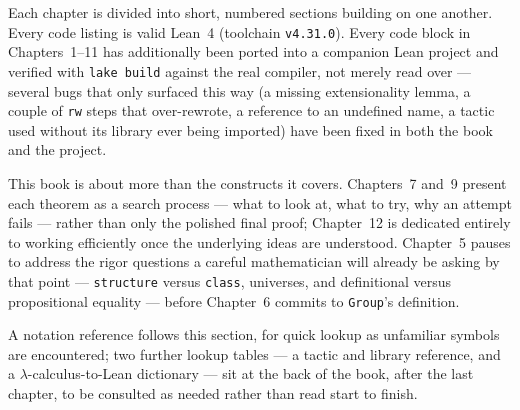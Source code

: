 Each chapter is divided into short, numbered sections building on one
another. Every code listing is valid Lean~4 (toolchain
\texttt{v4.31.0}). Every code block in Chapters~1--11 has additionally
been ported into a companion Lean project and verified with
\texttt{lake build} against the real compiler, not merely read over ---
several bugs that only surfaced this way (a missing extensionality
lemma, a couple of \texttt{rw} steps that over-rewrote, a reference to an
undefined name, a tactic used without its library ever being imported)
have been fixed in both the book and the project.

This book is about more than the constructs it covers. Chapters~7 and~9
present each theorem as a search process --- what to look at, what to
try, why an attempt fails --- rather than only the polished final proof;
Chapter~12 is dedicated entirely to working efficiently once the
underlying ideas are understood. Chapter~5 pauses to address the rigor
questions a careful mathematician will already be asking by that point
--- \texttt{structure} versus \texttt{class}, universes, and definitional
versus propositional equality --- before Chapter~6 commits to
\texttt{Group}'s definition.

A notation reference follows this section, for quick lookup as unfamiliar
symbols are encountered; two further lookup tables --- a tactic and
library reference, and a $\lambda$-calculus-to-Lean dictionary --- sit at
the back of the book, after the last chapter, to be consulted as needed
rather than read start to finish.

\tableofcontents
